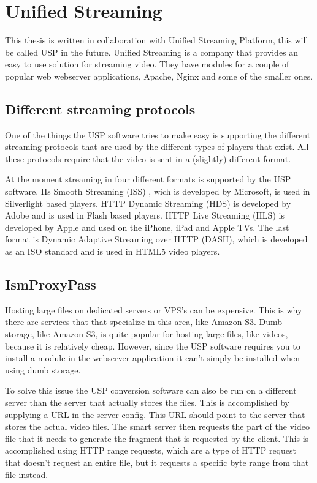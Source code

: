 \documentclass[twoside,openright]{uva-bachelor-thesis}
\begin{document}
\section{Unified Streaming}
This thesis is written in collaboration with Unified Streaming Platform, this
will be called USP in the future. Unified Streaming is a company that provides an easy to use
solution for streaming video. They have modules for a couple of popular web
webserver applications, Apache, Nginx and some of the smaller ones.


\subsection{Different streaming protocols}
One of the things the USP software tries to make easy is supporting the
different streaming protocols that are used by the different types of players
that exist. All these protocols require that the video is sent in a (slightly)
different format.

At the moment streaming in four different formats is supported by the USP
software. IIs Smooth Streaming (ISS) \autocite{smooth}, wich is developed by
Microsoft, is used in Silverlight based players. HTTP Dynamic Streaming (HDS)
\autocite{hds} is developed by Adobe and is used in Flash based players. HTTP Live
Streaming (HLS) \autocite{hls} is developed by Apple and used on the iPhone, iPad
and Apple TVs. The last format is Dynamic Adaptive Streaming over HTTP (DASH),
which is developed as an ISO standard and is used in HTML5 video players.


\subsection{IsmProxyPass}
Hosting large files on dedicated servers or VPS's can be expensive. This is why
there are services that that specialize in this area, like Amazon S3.
Dumb storage, like Amazon S3, is quite popular for hosting large files, like
videos, because it is relatively cheap. However, since the USP software requires
you to install a module in the webserver application it can't simply be
installed when using dumb storage.

To solve this issue the USP conversion software can also be run on a different
server than the server that actually stores the files. This is accomplished by
supplying a URL in the server config. This URL should point to the server that
stores the actual video files. The smart server then requests the part of the
video file that it needs to generate the fragment that is requested by the
client. This is accomplished using HTTP range requests\autocite{rangerequests},
which are a type of HTTP request that doesn't request an entire file, but
it requests a specific byte range from that file instead.
\end{document}
